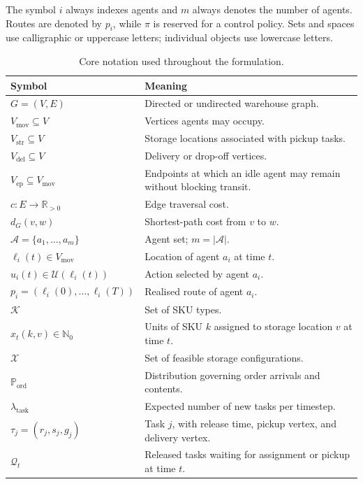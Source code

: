 \documentclass[../main.tex]{subfiles}
\begin{document}
The symbol \(i\) always indexes agents and \(m\) always denotes the number of
agents. Routes are denoted by \(p_i\), while \(\pi\) is reserved for a control
policy. Sets and spaces use calligraphic or uppercase letters; individual
objects use lowercase letters.

\begin{table}[htbp]
\centering
\caption{Core notation used throughout the formulation.}
\label{tab:notation}
\small
\begin{tabularx}{\textwidth}{@{}lX@{}}
\toprule
Symbol & Meaning \\
\midrule
\(G=(V,E)\) & Directed or undirected warehouse graph. \\
\(V_{\mathrm{mov}}\subseteq V\) & Vertices agents may occupy. \\
\(V_{\mathrm{str}}\subseteq V\) & Storage locations associated with pickup tasks. \\
\(V_{\mathrm{del}}\subseteq V\) & Delivery or drop-off vertices. \\
\(V_{\mathrm{ep}}\subseteq V_{\mathrm{mov}}\) & Endpoints at which an idle agent may remain without blocking transit. \\
\(c:E\rightarrow\mathbb{R}_{>0}\) & Edge traversal cost. \\
\(d_G(v,w)\) & Shortest-path cost from \(v\) to \(w\). \\
\(\mathcal{A}=\{a_1,\ldots,a_m\}\) & Agent set; \(m=|\mathcal{A}|\). \\
\(\ell_i(t)\in V_{\mathrm{mov}}\) & Location of agent \(a_i\) at time \(t\). \\
\(u_i(t)\in\mathcal{U}(\ell_i(t))\) & Action selected by agent \(a_i\). \\
\(p_i=(\ell_i(0),\ldots,\ell_i(T))\) & Realised route of agent \(a_i\). \\
\(\mathcal{K}\) & Set of SKU types. \\
\(x_t(k,v)\in\mathbb{N}_0\) & Units of SKU \(k\) assigned to storage location \(v\) at time \(t\). \\
\(\mathcal{X}\) & Set of feasible storage configurations. \\
\(\mathbb{P}_{\mathrm{ord}}\) & Distribution governing order arrivals and contents. \\
\(\lambda_{\mathrm{task}}\) & Expected number of new tasks per timestep. \\
\(\tau_j=(r_j,s_j,g_j)\) & Task \(j\), with release time, pickup vertex, and delivery vertex. \\
\(\mathcal{Q}_t\) & Released tasks waiting for assignment or pickup at time \(t\). \\

\end{tabularx}
\end{table}
\end{document}
